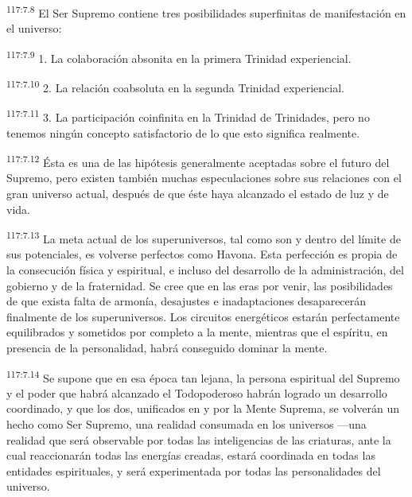\par
\textsuperscript{117:7.8} El Ser Supremo contiene tres posibilidades superfinitas de manifestación en el universo:

\par
\textsuperscript{117:7.9} 1. La colaboración absonita en la primera Trinidad experiencial.

\par
\textsuperscript{117:7.10} 2. La relación coabsoluta en la segunda Trinidad experiencial.

\par
\textsuperscript{117:7.11} 3. La participación coinfinita en la Trinidad de Trinidades, pero no tenemos ningún concepto satisfactorio de lo que esto significa realmente.

\par
\textsuperscript{117:7.12} Ésta es una de las hipótesis generalmente aceptadas sobre el futuro del Supremo, pero existen también muchas especulaciones sobre sus relaciones con el gran universo actual, después de que éste haya alcanzado el estado de luz y de vida.

\par
\textsuperscript{117:7.13} La meta actual de los superuniversos, tal como son y dentro del límite de sus potenciales, es volverse perfectos como Havona. Esta perfección es propia de la consecución física y espiritual, e incluso del desarrollo de la administración, del gobierno y de la fraternidad. Se cree que en las eras por venir, las posibilidades de que exista falta de armonía, desajustes e inadaptaciones desaparecerán finalmente de los superuniversos. Los circuitos energéticos estarán perfectamente equilibrados y sometidos por completo a la mente, mientras que el espíritu, en presencia de la personalidad, habrá conseguido dominar la mente.

\par
\textsuperscript{117:7.14} Se supone que en esa época tan lejana, la persona espiritual del Supremo y el poder que habrá alcanzado el Todopoderoso habrán logrado un desarrollo coordinado, y que los dos, unificados en y por la Mente Suprema, se volverán un hecho como Ser Supremo, una realidad consumada en los universos ---una realidad que será observable por todas las inteligencias de las criaturas, ante la cual reaccionarán todas las energías creadas, estará coordinada en todas las entidades espirituales, y será experimentada por todas las personalidades del universo.

